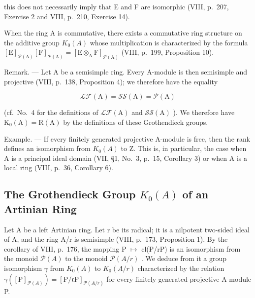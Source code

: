 this does not necessarily imply that E and F are isomorphic (VIII, p.~207, Exercise 2 and VIII, p.~210, Exercise 14).

When the ring A is commutative, there exists a commutative ring structure on the additive group \(K_{0}(A)\) whose multiplication is characterized by the formula \([\mathrm{E}]_{\mathcal{P}(\mathrm{A})}[\mathrm{F}]_{\mathcal{P}(\mathrm{A})} = [\mathrm{E} \otimes_{\mathrm{A}} \mathrm{F}]_{\mathcal{P}(\mathrm{A})}\) (VIII, p.~199, Proposition 10).

Remark. --- Let A be a semisimple ring. Every A-module is then semisimple and projective (VIII, p.~138, Proposition 4); we therefore have the equality

\[
\mathscr {L} \mathscr {F} (\mathrm{A}) = \mathscr {S S} (\mathrm{A}) = \mathscr {P} (\mathrm{A})
\]

(cf.~No.~4 for the definitions of \(\mathcal{LF}(\mathrm{A})\) and \(\mathcal{SS}(\mathrm{A})\) ). We therefore have \(\mathrm{K}_0(\mathrm{A}) = \mathrm{R}(\mathrm{A})\) by the definitions of these Grothendieck groups.

Example. --- If every finitely generated projective A-module is free, then the rank defines an isomorphism from \(K_{0}(A)\) to Z. This is, in particular, the case when A is a principal ideal domain (VII, §1, No.~3, p.~15, Corollary 3) or when A is a local ring (VIII, p.~36, Corollary 6).

\subsection{\texorpdfstring{The Grothendieck Group \(K_{0}(A)\) of an Artinian Ring}{The Grothendieck Group K\_\{0\}(A) of an Artinian Ring}}

Let A be a left Artinian ring. Let r be its radical; it is a nilpotent two-sided ideal of A, and the ring A/r is semisimple (VIII, p.~173, Proposition 1). By the corollary of VIII, p.~176, the mapping P \(\mapsto\) cl(P/rP) is an isomorphism from the monoid \(\mathcal{P}(A)\) to the monoid \(\mathcal{P}(A/r)\) . We deduce from it a group isomorphism \(\gamma\) from \(K_{0}(A)\) to \(K_{0}(A/r)\) characterized by the relation \(\gamma([\mathrm{P}]_{\mathcal{P}(A)}) = [\mathrm{P}/\mathfrak{r}\mathrm{P}]_{\mathcal{P}(A/r)}\) for every finitely generated projective A-module P.

